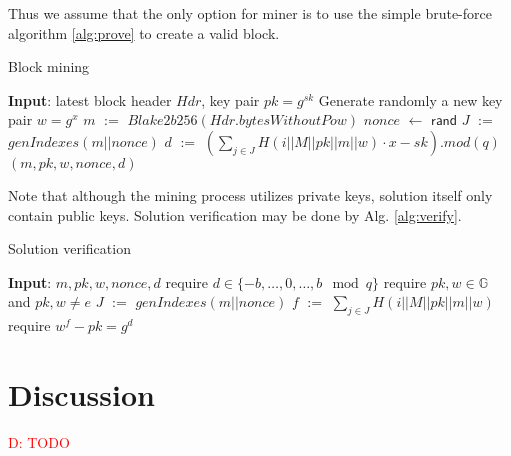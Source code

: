 \documentclass[]{article}
\newcommand{\dnote}[1]{\textcolor{red}{D: {#1}}}
\newcommand{\Name}{$Autolykos$}
\def\Let#1#2{\State #1 $:=$ #2}
\def\LetRnd#1#2{\State #1 $\gets$ #2}
\begin{document}
    Thus we assume that the only option for miner is to use the simple brute-force algorithm \ref{alg:prove} to
    create a valid block.

    \begin{algorithm}[H]
        \caption{Block mining}
        \label{alg:prove}
        \begin{algorithmic}[1]
            \State \textbf{Input}: latest block header $Hdr$, key pair $pk=g^{sk}$
            \State Generate randomly a new key pair $w=g^x$
            \Let{$m$}{$Blake2b256(Hdr.bytesWithoutPow)$}
                \LetRnd{$nonce$}{$\mathsf{rand}$}
                \Let{$J$}{$genIndexes(m||nonce)$}
                \Let{$d$}{$(\sum_{j \in J}{H(i||M||pk||m||w)} \cdot x - sk).mod(q)$}
                \State \Return $(m,pk,w,nonce,d)$
                \EndIf
            \EndWhile
        \end{algorithmic}
    \end{algorithm}

    Note that although the mining process utilizes private keys, solution itself
    only contain public keys. Solution verification may be done by Alg. \ref{alg:verify}.

    \begin{algorithm}[H]
        \caption{Solution verification}
        \label{alg:verify}
        \begin{algorithmic}[1]
            \State \textbf{Input}: $m,pk,w,nonce,d$
            \State require $d\in\{-b,\dots,0,\dots, b\mod q\}$
            \State require $pk,w\in \mathbb{G}$ and $pk,w \ne e$
            \Let{$J$}{$genIndexes(m||nonce)$}
            \Let{$f$}{$\sum_{j \in J} H(i||M||pk||m||w)$}
            \State require $w^f - pk = g^d$
        \end{algorithmic}
    \end{algorithm}

    \section{Discussion}
    \label{discussion}

    \dnote{TODO}

\end{document}
